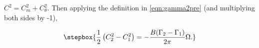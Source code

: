 \where \(C^2 = C_m^2 + C_\theta^2\).
Then applying the definition in \cref{eqn:gamma2pre} (and multiplying both sides by -1),

\begin{equation}
    \label{eqn:vjumprel}
    \stepbox{
    \frac{1}{2} \left(C_{2}^2 - C_{1}^2 \right) =  -\frac{B(\Gamma_2-\Gamma_1)}{2 \pi} \Omega.
}
\end{equation}










